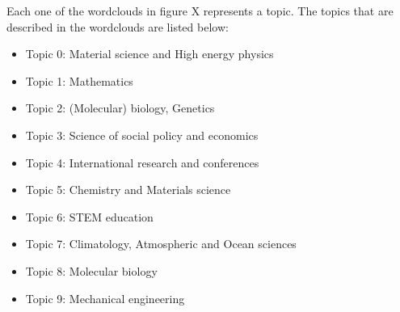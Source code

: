 \documentclass[12pt]{report}
\begin{document}
Each one of the wordclouds in figure X represents a topic. The topics that are
described in the wordclouds are listed below:

\begin{itemize}
\item[] Topic 0: Material science and High energy physics
\item[] Topic 1: Mathematics
\item[] Topic 2: (Molecular) biology, Genetics
\item[] Topic 3: Science of social policy and economics
\item[] Topic 4: International research and conferences
\item[] Topic 5: Chemistry and Materials science
\item[] Topic 6: STEM education
\item[] Topic 7: Climatology, Atmospheric and Ocean sciences
\item[] Topic 8: Molecular biology 
\item[] Topic 9: Mechanical engineering
\end{itemize}
\end{document}
